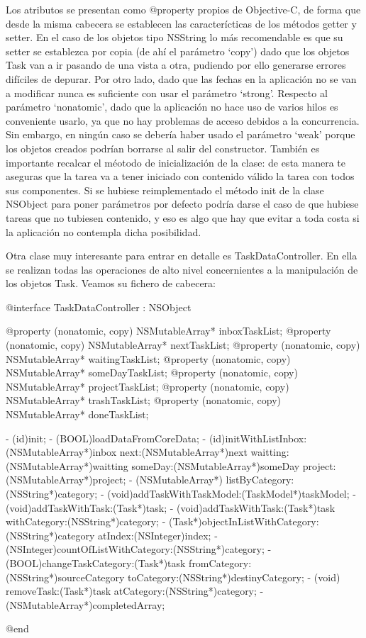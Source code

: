 \documentclass[parskip=half*]{scrartcl}
\begin{document}
Los atributos se presentan como @property propios de Objective-C, de forma que desde la misma cabecera se establecen las caracter\'icticas de los m\'etodos getter y setter. En el caso de los objetos tipo NSString lo m\'as recomendable es que su setter se establezca por copia (de ah\'i el par\'ametro `copy') dado que los objetos Task van a ir pasando de una vista a otra, pudiendo por ello generarse errores dif\'iciles de depurar. Por otro lado, dado que las fechas en la aplicaci\'on no se van a modificar nunca es suficiente con usar el par\'ametro `strong'. Respecto al par\'ametro `nonatomic', dado que la aplicaci\'on no hace uso de varios hilos es conveniente usarlo, ya que no hay problemas de acceso debidos a la concurrencia. Sin embargo, en ning\'un caso se deber\'ia haber usado el par\'ametro `weak' porque los objetos creados podr\'ian borrarse al salir del constructor. Tambi\'en es importante recalcar el m\'eotodo de inicializaci\'on de la clase: de esta manera te aseguras que la tarea va a tener iniciado con contenido v\'alido la tarea con todos sus componentes. Si se hubiese reimplementado el m\'etodo init de la clase NSObject para poner par\'ametros por defecto podr\'ia darse el caso de que hubiese tareas que no tubiesen contenido, y eso es algo que hay que evitar a toda costa si la aplicaci\'on no contempla dicha posibilidad.

Otra clase muy interesante para entrar en detalle es TaskDataController. En ella se realizan todas las operaciones de alto nivel concernientes a la manipulaci\'on de los objetos Task. Veamos su fichero de cabecera:

\begin{verbatimtab}
@interface TaskDataController : NSObject

@property (nonatomic, copy) NSMutableArray* inboxTaskList;
@property (nonatomic, copy) NSMutableArray* nextTaskList;
@property (nonatomic, copy) NSMutableArray* waitingTaskList;
@property (nonatomic, copy) NSMutableArray* someDayTaskList;
@property (nonatomic, copy) NSMutableArray* projectTaskList;
@property (nonatomic, copy) NSMutableArray* trashTaskList;
@property (nonatomic, copy) NSMutableArray* doneTaskList;


- (id)init;
- (BOOL)loadDataFromCoreData;
- (id)initWithListInbox:(NSMutableArray*)inbox next:(NSMutableArray*)next waitting:(NSMutableArray*)waitting someDay:(NSMutableArray*)someDay project:(NSMutableArray*)project;
- (NSMutableArray*) listByCategory:(NSString*)category;
- (void)addTaskWithTaskModel:(TaskModel*)taskModel;
- (void)addTaskWithTask:(Task*)task;
- (void)addTaskWithTask:(Task*)task withCategory:(NSString*)category;
- (Task*)objectInListWithCategory:(NSString*)category atIndex:(NSInteger)index;
- (NSInteger)countOfListWithCategory:(NSString*)category;
- (BOOL)changeTaskCategory:(Task*)task 
fromCategory:(NSString*)sourceCategory toCategory:(NSString*)destinyCategory;
- (void) removeTask:(Task*)task atCategory:(NSString*)category;
- (NSMutableArray*)completedArray;

@end
\end{verbatimtab}
\end{document}
